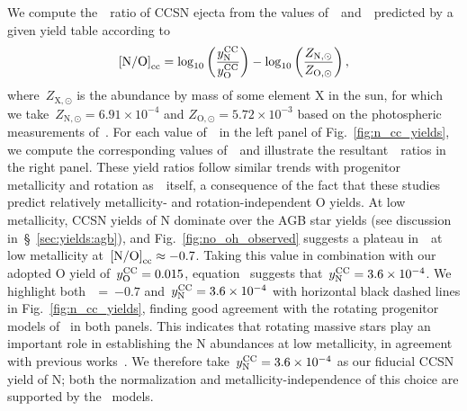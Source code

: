 \documentclass[ms.tex]{subfiles}
\begin{document}
\par
We compute the~\no~ratio of CCSN ejecta from the values
of~~and~~predicted by a given yield table according to
\begin{equation}
\text{[N/O]}_\text{cc} = 
\log_{10}\left(\frac{y_\text{N}^\text{CC}}{y_\text{O}^\text{CC}}\right) -
\log_{10}\left(\frac{Z_{\text{N},\odot}}{Z_{\text{O},\odot}}\right),
\label{eq:no_subcc}
\end{equation}
where~$Z_{\text{X},\odot}$ is the abundance by mass of some element X in the
sun, for which we take~$Z_{\text{N},\odot} = 6.91\times10^{-4}$ and
$Z_{\text{O},\odot} = 5.72\times10^{-3}$ based on the photospheric measurements
of~\citet{Asplund2009}.
For each value of~~in the left panel of Fig.~\ref{fig:n_cc_yields}, we
compute the corresponding values of~~and illustrate the
resultant~\no\subcc~ratios in the right panel.
These yield ratios follow similar trends with progenitor metallicity and
rotation as~~itself, a consequence of the fact that these
studies predict relatively metallicity- and rotation-independent O yields.
At low metallicity, CCSN yields of N dominate over the AGB star yields (see
discussion in~\S~\ref{sec:yields:agb}), and Fig.~\ref{fig:no_oh_observed}
suggests a plateau in~\no~at low metallicity at~$\text{[N/O]}_\text{cc}\approx-0.7$.
Taking this value in combination with our adopted O yield of~$y_\text{O}^\text{CC} = 0.015$,
equation~ suggests that~$y_\text{N}^\text{CC} = 3.6\times10^{-4}$.
We highlight both~\no\subcc~=~$-0.7$ and~$y_\text{N}^\text{CC} = 3.6\times10^{-4}$ with
horizontal black dashed lines in Fig.~\ref{fig:n_cc_yields}, finding good
agreement with the rotating progenitor models of~\citet{Limongi2018} in both
panels.
This indicates that rotating massive stars play an important role in
establishing the N abundances at low metallicity, in agreement with previous
works~\citep{Chiappini2003, Chiappini2005, Chiappini2006, Kobayashi2011,
Prantzos2018, Grisoni2021}.
We therefore take~$y_\text{N}^\text{CC} = 3.6\times10^{-4}$ as our fiducial CCSN yield of N;
both the normalization and metallicity-independence of this choice are
supported by the~\citet{Limongi2018} models.
\end{document}
